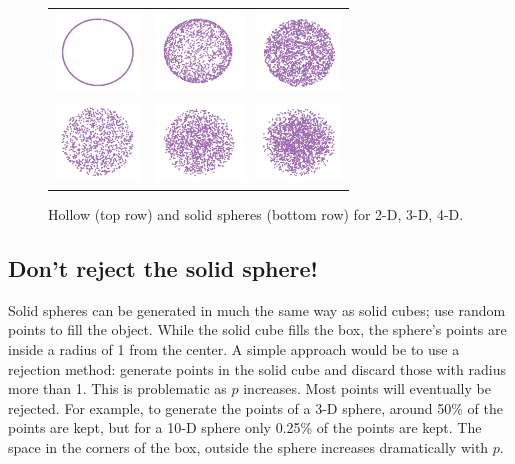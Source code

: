 \begin{figure}[ht]
\centering
\begin{tabular}{c c c}
\includegraphics[width=0.9in]{fig/sphere-2.pdf}
&\includegraphics[width=0.9in]{fig/sphere-3.pdf}
&\includegraphics[width=0.9in]{fig/sphere-4.pdf}
\\
\includegraphics[width=0.9in]{fig/sphere-2-solid.pdf}
&\includegraphics[width=0.9in]{fig/sphere-3-solid.pdf}
&\includegraphics[width=0.9in]{fig/sphere-4-solid.pdf}
\end{tabular}
\caption{Hollow (top row) and solid spheres (bottom row) for 2-D, 3-D,
  4-D.}
\label{holsolidsphere}
\end{figure}

\subsection{Don't reject the solid sphere!}

Solid spheres can be generated in much the same way as solid cubes; use
random points to fill the object. While the solid cube fills the box,
the sphere's points are inside a radius of 1 from the center. A simple
approach would be to use a rejection method: generate points in the
solid cube and discard those with radius more than 1. This is
problematic as $p$ increases. Most points will eventually be rejected.
For example, to generate the points of a 3-D sphere, around 50\% of
the points are kept, but for a 10-D sphere only 0.25\% of the points
are kept. The space in the corners of the box, outside the sphere
increases dramatically with $p$.

